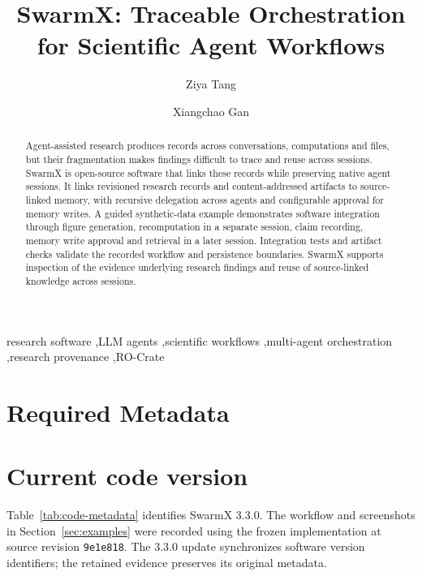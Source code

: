 \documentclass[preprint,12pt,a4paper]{elsarticle}
\begin{document}
\begin{frontmatter}

\title{SwarmX: Traceable Orchestration for Scientific Agent Workflows}

\author[1]{Ziya Tang}
\author[1]{Xiangchao Gan}

\begin{abstract}
Agent-assisted research produces records across conversations, computations and files, but their
fragmentation makes findings difficult to trace and reuse across sessions. SwarmX is open-source
software that links these records while preserving native agent sessions. It links revisioned
research records and content-addressed artifacts to source-linked memory, with recursive delegation
across agents and configurable approval for memory writes. A guided synthetic-data example
demonstrates software integration through figure generation, recomputation in a separate session,
claim recording, memory write approval and retrieval in a later session. Integration tests and artifact
checks validate the recorded workflow and persistence boundaries. SwarmX supports inspection of
the evidence underlying research findings and reuse of source-linked knowledge across sessions.
\end{abstract}

\begin{keyword}
research software \sep LLM agents \sep scientific workflows \sep multi-agent orchestration
\sep research provenance \sep RO-Crate
\end{keyword}

\end{frontmatter}

\section*{Required Metadata}
\section*{Current code version}

Table~\ref{tab:code-metadata} identifies SwarmX 3.3.0. The workflow and screenshots in
Section~\ref{sec:examples} were recorded using the frozen implementation at source revision
\texttt{9e1e818}. The 3.3.0 update synchronizes software version identifiers; the retained
evidence preserves its original metadata.
\end{document}
